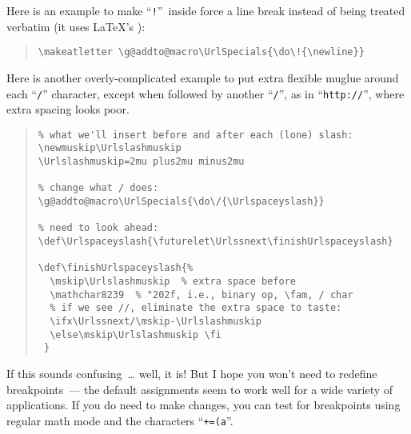 \documentclass[a4paper,11pt]{article}
\begin{document}
Here is an example to make ``\texttt{!}''\ inside  force a line break
instead of being treated verbatim (it uses \LaTeX's ):

\begin{quote}
\verb+\makeatletter \g@addto@macro\UrlSpecials{\do\!{\newline}}+
\end{quote}

Here is another overly-complicated  example to put extra flexible
muglue around each ``\texttt{/}'' character, except when followed 
by another ``\texttt{/}'', as in ``\texttt{http://}'', where extra 
spacing looks poor.

\begin{quote}
\begin{verbatim}
% what we'll insert before and after each (lone) slash:
\newmuskip\Urlslashmuskip 
\Urlslashmuskip=2mu plus2mu minus2mu

% change what / does:
\g@addto@macro\UrlSpecials{\do\/{\Urlspaceyslash}}

% need to look ahead:
\def\Urlspaceyslash{\futurelet\Urlssnext\finishUrlspaceyslash}

\def\finishUrlspaceyslash{%
  \mskip\Urlslashmuskip  % extra space before
  \mathchar8239  % "202f, i.e., binary op, \fam, / char
  % if we see //, eliminate the extra space to taste:
  \ifx\Urlssnext/\mskip-\Urlslashmuskip
  \else\mskip\Urlslashmuskip \fi
 }
\end{verbatim}
\end{quote}

If this sounds confusing~\dots{} well, it is!  But I hope you
won't need to redefine breakpoints~--- the default assignments seem to
work well for a wide variety of applications.  If you do need to make
changes, you can test for breakpoints using regular math mode and the
characters ``\texttt{+=(a}''. 
\end{document}
